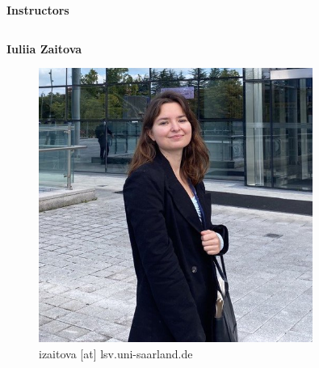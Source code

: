 \documentclass[aspectratio=169]{beamer}
\begin{document}
\begin{frame}{}
\begin{center}
\textbf{Instructors}
\begin{columns}[T]

    \begin{column}{0.3\textwidth}
    \begin{center}
    \textbf{Iuliia Zaitova}
    \begin{figure}
        \includegraphics[width=0.8\textwidth, height=0.8\textwidth]{Images/yulia_photo.jpg}
        \caption{ izaitova [at] lsv.uni-saarland.de}
        \label{fig:cockroach}
    \end{figure}
    \end{center}
    \end{column}


\end{columns}
\end{center}
\end{frame}
\end{document}
